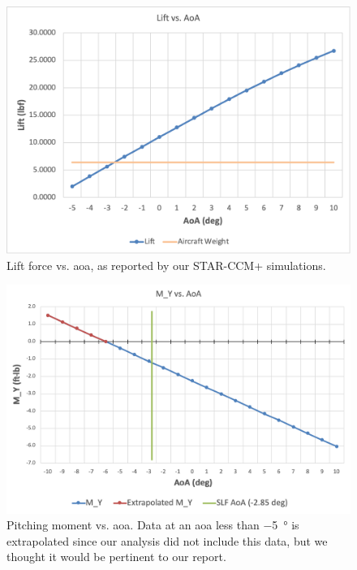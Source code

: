 \begin{figure}[htpb]
    \centering
    \includegraphics[width=\linewidth]{Figures/lift_vs_aoa.png}
    \caption[Lift vs. \acrshort{aoa}]{Lift force vs. \acrshort{aoa}, as reported by our STAR-CCM+ simulations.}
    \label{fig:lift_vs_aoa}
\end{figure}

\begin{figure}[htpb]
    \centering
    \includegraphics[width=\linewidth]{Figures/moment_vs_aoa.png}
    \caption[Pitching moment vs. \acrshort{aoa}]{Pitching moment vs. \acrshort{aoa}. Data at an \acrshort{aoa} less than \qty{-5}{\degree} is extrapolated since our analysis did not include this data, but we thought it would be pertinent to our report.}
    \label{fig:moment_vs_aoa}
\end{figure}
